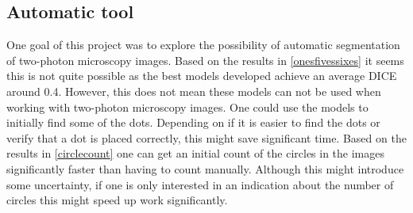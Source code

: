 \subsection{Automatic tool}
One goal of this project was to explore the possibility of automatic segmentation of two-photon microscopy images. Based on the results in \autoref{onesfivessixes} it seems this is not quite possible as the best models developed achieve an average DICE around 0.4. However, this does not mean these models can not be used when working with two-photon microscopy images. One could use the models to initially find some of the dots. Depending on if it is easier to find the dots or verify that a dot is placed correctly, this might save significant time. Based on the results in \autoref{circlecount} one can get an initial count of the circles in the images significantly faster than having to count manually. Although this might introduce some uncertainty, if one is only interested in an indication about the number of circles this might speed up work significantly.